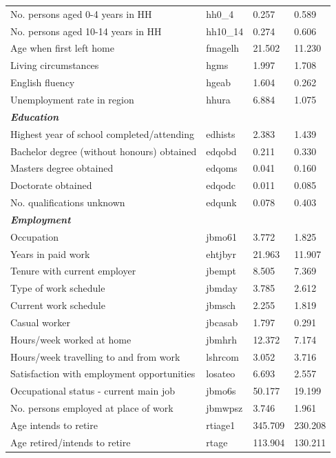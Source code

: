 \documentclass[12pt, a4paper]{article}
\begin{document}
\begin{longtable}{p{} C{0.15\textwidth} C{0.15\textwidth} C{0.15\textwidth}}
No.  persons aged 0-4 years in HH 	& 	hh0\_4	 & 	0.257	 & 	0.589	 \\
No.  persons aged 10-14 years in HH 	& 	hh10\_14	 & 	0.274	 & 	0.606	 \\
Age when first left home 	& 	fmagelh	 & 	21.502	 & 	11.230	 \\
Living circumstances 	& 	hgms	 & 	1.997	 & 	1.708	 \\
English fluency 	& 	hgeab	 & 	1.604	 & 	0.262	 \\
Unemployment rate in region	& 	hhura	 & 	6.884	 & 	1.075	 \\
\textbf{\textit{Education}} 	& 		 & 		 & 		 \\
Highest year of school completed/attending 	& 	edhists	 & 	2.383	 & 	1.439	 \\
Bachelor degree (without honours) obtained 	& 	edqobd	 & 	0.211	 & 	0.330	 \\
Masters degree obtained 	& 	edqoms	 & 	0.041	 & 	0.160	 \\
Doctorate obtained 	& 	edqodc	 & 	0.011	 & 	0.085	 \\
No.  qualifications unknown 	& 	edqunk	 & 	0.078	 & 	0.403	 \\
\textbf{\textit{Employment}} 	& 		 & 		 & 		 \\
Occupation 	& 	jbmo61	 & 	3.772	 & 	1.825	 \\
Years in paid work 	& 	ehtjbyr	 & 	21.963	 & 	11.907	 \\
Tenure with current employer 	& 	jbempt	 & 	8.505	 & 	7.369	 \\
Type of work schedule 	& 	jbmday	 & 	3.785	 & 	2.612	 \\
Current work schedule 	& 	jbmsch	 & 	2.255	 & 	1.819	 \\
Casual worker 	& 	jbcasab	 & 	1.797	 & 	0.291	 \\
Hours/week worked at home 	& 	jbmhrh	 & 	12.372	 & 	7.174	 \\
Hours/week travelling to and from work 	& 	lshrcom	 & 	3.052	 & 	3.716	 \\
Satisfaction with employment opportunities 	& 	losateo	 & 	6.693	 & 	2.557	 \\
Occupational status - current main job 	& 	jbmo6s	 & 	50.177	 & 	19.199	 \\
No.  persons employed at place of work 	& 	jbmwpsz	 & 	3.746	 & 	1.961	 \\
Age intends to retire 	& 	rtiage1	 & 	345.709	 & 	230.208	 \\
Age retired/intends to retire 	& 	rtage	 & 	113.904	 & 	130.211	 \\

\end{longtable}
\end{document}
